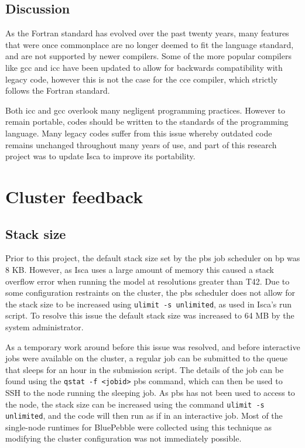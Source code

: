 \documentclass[a4paper,11pt]{report}
\begin{document}
\subsection{Discussion}
As the Fortran standard has evolved over the past twenty years, many features that were once commonplace are no longer deemed to fit the language standard, and are not supported by newer compilers. Some of the more popular compilers like \gls{gcc} and \gls{icc} have been updated to allow for backwards compatibility with legacy code, however this is not the case for the \gls{cce} compiler, which strictly follows the Fortran standard.
\par
Both \gls{icc} and \gls{gcc} overlook many negligent programming practices. However to remain portable, codes should be written to the standards of the programming language. Many legacy codes suffer from this issue whereby outdated code remains unchanged throughout many years of use, and part of this research project was to update Isca to improve its portability.


\section{Cluster feedback}
\subsection{Stack size}
Prior to this project, the default stack size set by the \gls{pbs} job scheduler on \gls{bp} was 8 KB. However, as Isca uses a large amount of memory this caused a stack overflow error when running the model at resolutions greater than T42. Due to some configuration restraints on the cluster, the \gls{pbs} scheduler does not allow for the stack size to be increased using \texttt{ulimit -s unlimited}, as used in Isca's run script. To resolve this issue the default stack size was increased to 64 MB by the system administrator.
\par
As a temporary work around before this issue was resolved, and before interactive jobs were available on the cluster, a regular job can be submitted to the queue that sleeps for an hour in the submission script. The details of the job can be found using the  \texttt{qstat -f <jobid>} \gls{pbs} command, which can then be used to SSH to the node running the sleeping job. As \gls{pbs} has not been used to access to the node, the stack size can be increased using the command \texttt{ulimit -s unlimited}, and the code will then run as if in an interactive job. Most of the single-node runtimes for BluePebble were collected using this technique as modifying the cluster configuration was not immediately possible. 
\end{document}
